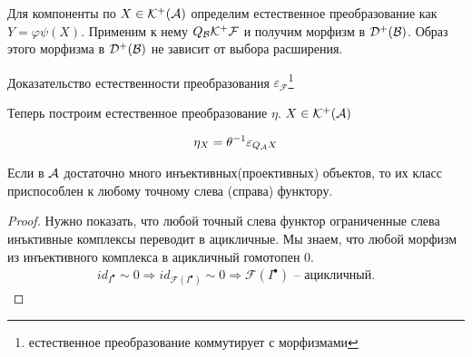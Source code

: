 \documentclass[../main.tex]{subfiles}
\begin{document}
Для компоненты по $X \in \mathcal{K^+(A)}$ определим естественное преобразование как  $Y = \varphi\psi (X)$. Применим к нему $Q_{\mathcal{B}}\mathcal{K^+ F}$ и получим морфизм в $\mathcal{D^+(B)}$. Образ этого морфизма в $\mathcal{D^+(B)}$ не зависит от выбора расширения.
\bee
{}
\eee
Доказательство естественности преобразования $\varepsilon_{\mathcal{F}}$\footnote{естественное преобразование коммутирует с морфизмами}
\bee
{}
\eee
\bee
{}
\eee
Теперь построим естественное преобразование $\eta$. $X\in\mathcal{K^+(A)}$
\bee
{}    
 \eee
 \begin{align*}
     \eta_{X} = \theta^{-1}\varepsilon_{Q_{\mathcal{A}}X}
 \end{align*}
 \begin{to_claim}
Если в $\mathcal{A}$ достаточно много инъективных(проективных) объектов, то их класс приспособлен к любому точному слева (справа) функтору.
 \end{to_claim}
 \begin{proof}
 Нужно показать, что любой точный слева функтор ограниченные слева инъктивные комплексы переводит в ацикличные. Мы знаем, что любой морфизм из инъективного комплекса в ацикличный гомотопен 0. 
 \begin{align*}
     id_{I^\bullet} \sim 0 \Rightarrow id_{\mathcal{F}(I^\bullet)}\sim 0 \Rightarrow \mathcal{F}(I^\bullet) \text{ -- ацикличный.}
 \end{align*}
 \end{proof}
\end{document}
